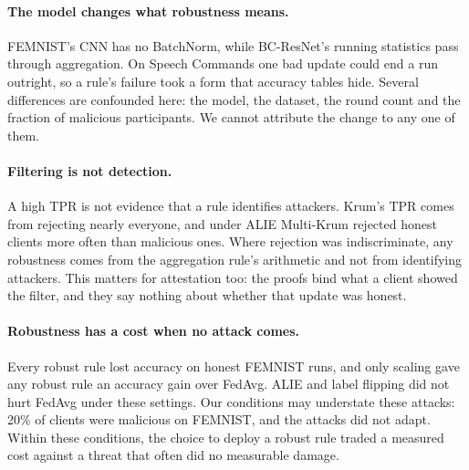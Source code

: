 \paragraph{The model changes what robustness means.}
FEMNIST's CNN has no BatchNorm, while BC-ResNet's running statistics pass through aggregation. On Speech Commands one bad update could end a run outright, so a rule's failure took a form that accuracy tables hide. Several differences are confounded here: the model, the dataset, the round count and the fraction of malicious participants. We cannot attribute the change to any one of them.

\paragraph{Filtering is not detection.}
A high TPR is not evidence that a rule identifies attackers. Krum's TPR comes from rejecting nearly everyone, and under ALIE Multi-Krum rejected honest clients more often than malicious ones. Where rejection was indiscriminate, any robustness comes from the aggregation rule's arithmetic and not from identifying attackers. This matters for attestation too: the proofs bind what a client showed the filter, and they say nothing about whether that update was honest.

\paragraph{Robustness has a cost when no attack comes.}
Every robust rule lost accuracy on honest FEMNIST runs, and only scaling gave any robust rule an accuracy gain over FedAvg. ALIE and label flipping did not hurt FedAvg under these settings. Our conditions may understate these attacks: 20\% of clients were malicious on FEMNIST, and the attacks did not adapt. Within these conditions, the choice to deploy a robust rule traded a measured cost against a threat that often did no measurable damage.
